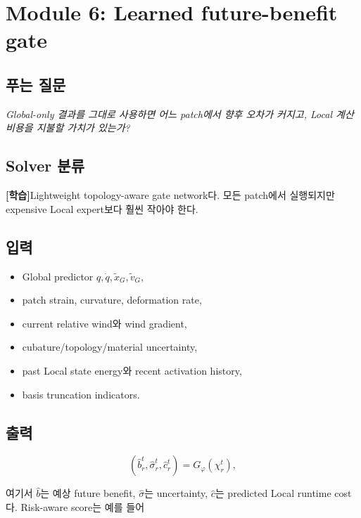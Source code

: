 \documentclass[11pt,a4paper]{article}
\newcommand{\learned}{\textcolor{darkpurple}{\textbf{[학습]}}}
\begin{document}
\section{Module 6: Learned future-benefit gate}

\subsection*{푸는 질문}

\emph{Global-only 결과를 그대로 사용하면 어느 patch에서 향후 오차가 커지고,
Local 계산 비용을 지불할 가치가 있는가?}

\subsection*{Solver 분류}

\learned Lightweight topology-aware gate network다.
모든 patch에서 실행되지만 expensive Local expert보다 훨씬 작아야 한다.

\subsection*{입력}

\begin{itemize}[leftmargin=1.5em]
  \item Global predictor \(q,\dot q,\widetilde x_G,\widetilde v_G\),
  \item patch strain, curvature, deformation rate,
  \item current relative wind와 wind gradient,
  \item cubature/topology/material uncertainty,
  \item past Local state energy와 recent activation history,
  \item basis truncation indicators.
\end{itemize}

\subsection*{출력}

\begin{equation}
  (\widehat b_r^t,\widehat\sigma_r^t,\widehat c_r^t)
  =
  G_\varphi(\chi_r^t),
\end{equation}

여기서 \(\widehat b\)는 예상 future benefit,
\(\widehat\sigma\)는 uncertainty,
\(\widehat c\)는 predicted Local runtime cost다.
Risk-aware score는 예를 들어
\end{document}
